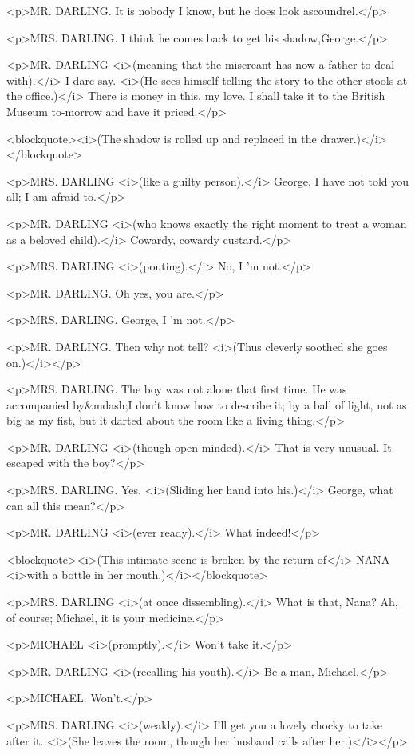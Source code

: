 <p>MR. DARLING. It is nobody I know, but he does look ascoundrel.</p>

<p>MRS. DARLING. I think he comes back to get his shadow,George.</p>

<p>MR. DARLING <i>(meaning that the miscreant has now a father to
deal with).</i> I dare say. <i>(He sees himself telling the story to
the other stools at the office.)</i> There is money in this, my love.
I shall take it to the British Museum to-morrow and have it
priced.</p>

<blockquote><i>(The shadow is rolled up and replaced in the
drawer.)</i></blockquote>

<p>MRS. DARLING <i>(like a guilty person).</i> George, I have not
told you all; I am afraid to.</p>

<p>MR. DARLING <i>(who knows exactly the right moment to treat a
woman as a beloved child).</i> Cowardy, cowardy custard.</p>

<p>MRS. DARLING <i>(pouting).</i> No, I 'm not.</p>

<p>MR. DARLING. Oh yes, you are.</p>

<p>MRS. DARLING. George, I 'm not.</p>

<p>MR. DARLING. Then why not tell? <i>(Thus cleverly soothed she goes
on.)</i></p>

<p>MRS. DARLING. The boy was not alone that first time. He was
accompanied by&mdash;I don't know how to describe it; by a ball of
light, not as big as my fist, but it darted about the room like a
living thing.</p>

<p>MR. DARLING <i>(though open-minded).</i> That is very unusual. It
escaped with the boy?</p>

<p>MRS. DARLING. Yes. <i>(Sliding her hand into his.)</i> George,
what can all this mean?</p>

<p>MR. DARLING <i>(ever ready).</i> What indeed!</p>

<blockquote><i>(This intimate scene is broken by the return of</i>
NANA <i>with a bottle in her mouth.)</i></blockquote>

<p>MRS. DARLING <i>(at once dissembling).</i> What is that, Nana? Ah,
of course; Michael, it is your medicine.</p>

<p>MICHAEL <i>(promptly).</i> Won't take it.</p>

<p>MR. DARLING <i>(recalling his youth).</i> Be a man, Michael.</p>

<p>MICHAEL. Won't.</p>

<p>MRS. DARLING <i>(weakly).</i> I'll get you a lovely chocky to take
after it. <i>(She leaves the room, though her husband calls after
her.)</i></p>

